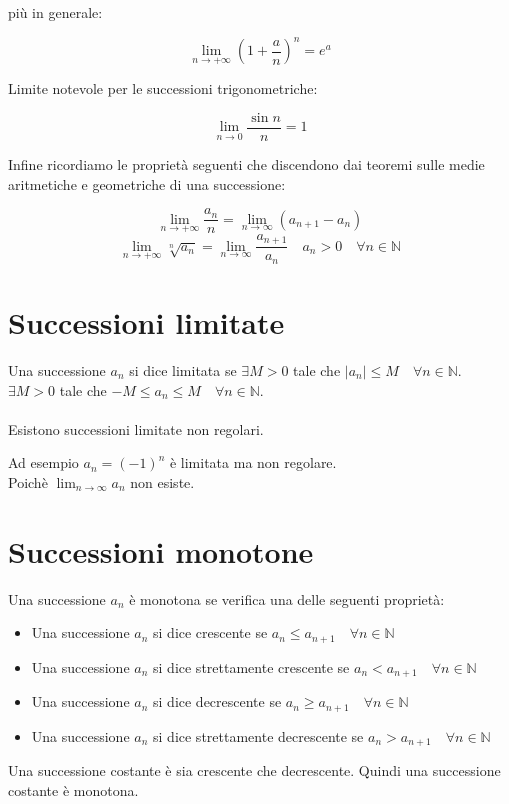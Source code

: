 \documentclass{article}
\begin{document}
\begin{center}
    più in generale:
\end{center}
\begin{equation}
    \lim_{n\to+\infty}\left(1+\frac{a}{n}\right)^n=e^a
\end{equation}
\begin{center}
    Limite notevole per le successioni trigonometriche:
\end{center}
\begin{equation}
    \lim_{n\to0}\frac{\sin n}{n}=1
\end{equation}
\begin{center}
    Infine ricordiamo le proprietà seguenti che discendono dai teoremi sulle medie aritmetiche e geometriche di una successione:
\end{center}
\begin{equation}
    \lim_{n\to+\infty}\frac{a_n}{n} = \lim_{n\to\infty}(a_{n+1}-a_n)
\end{equation}
\begin{equation}
    \lim_{n\to+\infty}\sqrt[n]{a_n} = \lim_{n\to\infty}\frac{a_{n+1}}{a_n} \quad a_n>0\quad \forall n\in\mathbb{N}
\end{equation}
\section*{Successioni limitate}
Una successione $a_n$ si dice limitata se $\exists M>0$ tale che $|a_n|\leq
    M\quad\forall n\in\mathbb{N}$.\\ $\exists M>0$ tale che $-M\leq a_n\leq
    M\quad\forall n\in\mathbb{N}$.\\\\
Esistono successioni limitate non regolari.
\begin{esbox}
    Ad esempio $a_n=(-1)^n$ è limitata ma non regolare.\\
    Poichè $\lim_{n\to\infty}a_n$ non esiste.
\end{esbox}
\newpage
\section*{Successioni monotone}
Una successione $a_n$ è monotona se verifica una delle seguenti proprietà:
\begin{itemize}
    \item Una successione $a_n$ si dice crescente se $a_n\leq a_{n+1}\quad\forall
              n\in\mathbb{N}$
    \item Una successione $a_n$ si dice strettamente crescente se $a_n<
              a_{n+1}\quad\forall n\in\mathbb{N}$
    \item Una successione $a_n$ si dice decrescente se $a_n\geq a_{n+1}\quad\forall
              n\in\mathbb{N}$
    \item Una successione $a_n$ si dice strettamente decrescente se $a_n>
              a_{n+1}\quad\forall n\in\mathbb{N}$
\end{itemize}
Una successione costante è sia crescente che decrescente. Quindi una successione costante è monotona.
\end{document}
